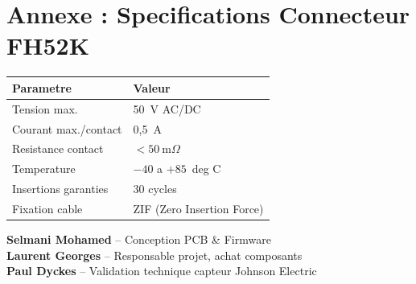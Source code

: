 \documentclass[12pt,a4paper]{article}
\begin{document}
\section*{Annexe : Specifications Connecteur FH52K}

\begin{center}
\begin{tabular}{ll}
\toprule
\textbf{Parametre} & \textbf{Valeur} \\
\midrule
Tension max.         & 50~V AC/DC \\
Courant max./contact & 0,5~A \\
Resistance contact   & $< 50~\mathrm{m}\Omega$ \\
Temperature          & $-40$ a $+85$~deg C \\
Insertions garanties & 30 cycles \\
Fixation cable       & ZIF (Zero Insertion Force) \\
\bottomrule
\end{tabular}
\end{center}

\vspace{1cm}
\begin{tcolorbox}[colback=gray!10,colframe=gray!50,title=Equipe Projet]
\textbf{Selmani Mohamed} -- Conception PCB \& Firmware\\
\textbf{Laurent Georges} -- Responsable projet, achat composants\\
\textbf{Paul Dyckes} -- Validation technique capteur Johnson Electric
\end{tcolorbox}
\end{document}
